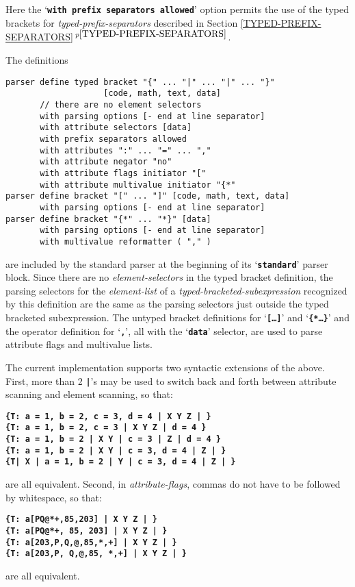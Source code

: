 \documentclass[12pt]{article}
\newcommand{\TT}[1]{{\tt \bfseries #1}}
\newcommand{\itemref}[1]{\ref{#1}$\,^{p\pageref{#1}}$}
\newenvironment{indpar}[1][0.3in]%
	{\begin{list}{}%
		     {\setlength{\itemsep}{0in}%
		      \setlength{\topsep}{0in}%
		      \setlength{\parsep}{1ex}%
		      \setlength{\labelwidth}{#1}%
		      \setlength{\leftmargin}{#1}%
		      \addtolength{\leftmargin}{\labelsep}}%
	 \item}%
	{\end{list}}
\begin{document}
Here the `\TT{with prefix separators allowed}' option permits the use of
the typed brackets for {\em typed-prefix-separators} described in
Section \itemref{TYPED-PREFIX-SEPARATORS}.

The definitions
\begin{indpar}\begin{verbatim}
parser define typed bracket "{" ... "|" ... "|" ... "}"
                    [code, math, text, data]
       // there are no element selectors
       with parsing options [- end at line separator]
       with attribute selectors [data]
       with prefix separators allowed
       with attributes ":" ... "=" ... ","
       with attribute negator "no"
       with attribute flags initiator "["
       with attribute multivalue initiator "{*"
parser define bracket "[" ... "]" [code, math, text, data]
       with parsing options [- end at line separator]
parser define bracket "{*" ... "*}" [data]
       with parsing options [- end at line separator]
       with multivalue reformatter ( "," )
\end{verbatim}\end{indpar}
are included by the standard parser at the beginning of
its `\TT{standard}' parser block.  Since there are no
{\em element-selectors} in the typed bracket definition,
the parsing selectors
for the {\em element-list} of a {\em typed-bracketed-subexpression}
recognized by this definition are the same as the parsing selectors
just outside the typed bracketed subexpression.
The untyped bracket definitions for `\TT{[\ldots]}' and
`\TT{\{*\ldots*\}}' and the operator definition for `\TT{,}',
all with the `\TT{data}' selector, are used to parse
attribute flags and multivalue lists.

The current implementation supports two syntactic extensions of
the above.  First, more than 2 \TT{|}'s may be used to switch
back and forth between attribute scanning and element scanning,
so that:
\begin{center}
\TT{\{T: a = 1, b = 2, c = 3, d = 4 | X Y Z | \}} \\
\TT{\{T: a = 1, b = 2, c = 3 | X Y Z | d = 4 \}} \\
\TT{\{T: a = 1, b = 2 | X Y | c = 3 | Z | d = 4 \}} \\
\TT{\{T: a = 1, b = 2 | X Y | c = 3, d = 4 | Z | \}} \\
\TT{\{T| X | a = 1, b = 2 | Y | c = 3, d = 4 | Z | \}} \\
\end{center}
are all equivalent.  Second, in {\em attribute-flags}, commas
do not have to be followed by whitespace, so that:
\begin{center}
\TT{\{T: a[PQ@*+,85,203] | X Y Z | \}} \\
\TT{\{T: a[PQ@*+, 85, 203] | X Y Z | \}} \\
\TT{\{T: a[203,P,Q,@,85,*,+] | X Y Z | \}} \\
\TT{\{T: a[203,P, Q,@,85, *,+] | X Y Z | \}} \\
\end{center}
are all equivalent.
\end{document}
